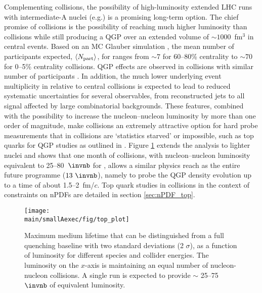 Complementing \PbPb collisions, 
the possibility of high-luminosity extended LHC runs with intermediate-A nuclei (e.g.\ArAr)
is a promising long-term option.
The chief promise of \ArAr collisions is the possibility of reaching much higher luminosity than \PbPb collisions while still producing a QGP over an extended volume of $\sim 1000$~fm$^3$ in central events. Based on an MC Glauber simulation \cite{Loizides:2017ack}, the mean number of participants expected, $\langle N_{\rm part}\rangle$, for \ArAr ranges from  $\sim 7$ for 60--80\% centrality to $\sim 70$ for 0--5\% centrality collisions.  
QGP effects are observed in \PbPb collisions with similar number of participants \cite{Sirunyan:2018eqi, ATLAS-CONF-2018-007}.  In addition, the much lower underlying event multiplicity in \ArAr relative to central \PbPb collisions is expected to lead to reduced  systematic uncertainties for several observables, from reconstructed jets to all signal affected by large combinatorial backgrounds.  These features, combined with the possibility to increase the nucleon--nucleon luminosity by more than one order of magnitude, make \ArAr collisions an extremely attractive option for hard probe measurements that in \PbPb collisions are `statistics starved' or impossible, such as top quarks for QGP studies as outlined in \cite{Apolinario:2017sob}.  Figure \ref{fig:boosted_tops} extends the analysis to lighter nuclei and shows that one month of \ArAr collisions, with nucleon--nucleon luminosity equivalent to 25--80~$\invnb$ for \PbPb, allows a similar physics reach as the entire \PbPb future programme ($13~\invnb$), namely to probe the QGP density evolution up to a time of about 1.5--2~fm/$c$.  Top quark studies in \ArAr collisions in the context of constraints on nPDFs are detailed in section \ref{sec:nPDF_top}.
\begin{figure}
\centering
\texttt{[image: \\main/smallAexec/fig/top\_plot]}
\caption{Maximum medium lifetime that can be distinguished from a full quenching baseline with two standard deviations (2 $\sigma$), as a function of luminosity for different species and collider energies. The luminosity on the $x$-axis is maintaining an equal number of nucleon-nucleon collisions. A single \ArAr run is expected to provide $\sim$ 25--75 $\invnb$ of \PbPb equivalent luminosity.}
\label{fig:boosted_tops}
\end{figure}

